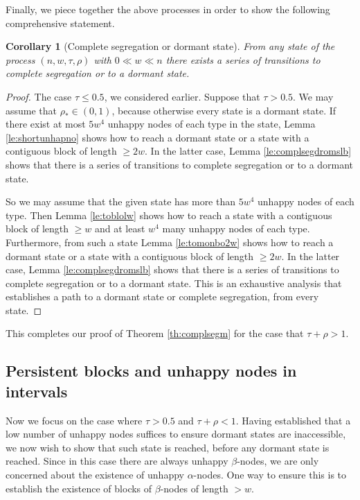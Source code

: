 \documentclass[11pt]{article}
\theoremstyle{plain}
\newtheorem{coro}[thm]{Corollary}
\numberwithin{equation}{subsection}
\begin{document}
Finally, we piece together the above processes in order to show the following
comprehensive statement.
\begin{coro}[Complete segregation or dormant state]\label{coro:inevcompsegd1}
From any state of the process $(n, w, \tau, \rho)$ with $0\ll w\ll n$
there exists a series of transitions to complete segregation or to a dormant state.
\end{coro}
\begin{proof}
The case  $\tau\leq 0.5$, we considered earlier. 
Suppose that $\tau>0.5$. 
We may assume that
$\rho_{\ast}\in (0,1)$, because otherwise
every state is a dormant state. 
If there exist at most $5w^4$ unhappy nodes of each type in the state, 
Lemma \ref{le:shortunhapno} shows how to reach a dormant state or a state
with a contiguous block
of length $\geq 2w$. In the latter case, 
Lemma \ref{le:complsegdromslb} shows that there is a series of transitions
to complete segregation or to a dormant state.

So we may assume that  the given state has more than 
$5w^4$ unhappy nodes of each type.
Then Lemma \ref{le:toblolw} shows how to reach a state with a contiguous block
of length $\geq w$ and at least $w^4$ many unhappy nodes of each type.
Furthermore, from such a state Lemma \ref{le:tomonbo2w} shows how to reach a 
dormant state or a state
with a contiguous block
of length $\geq 2w$. In the latter case,  
Lemma \ref{le:complsegdromslb} shows that there is a series of transitions
to complete segregation or to a dormant state.
This is an exhaustive analysis that establishes a path to a dormant state or complete segregation, from
every state.
\end{proof}

This completes our proof of Theorem \ref{th:complsegm} for the  case that $\tau +\rho>1$.

\subsection{Persistent blocks and unhappy nodes in intervals}
Now we focus on the case where $\tau>0.5$ and $\tau +\rho<1$.
Having established that a low number of unhappy nodes suffices to ensure dormant states are inaccessible, we now wish 
to show that such state is reached, before any dormant state is reached. Since in this case there are always
unhappy $\beta$-nodes, we are only concerned about the existence of unhappy $\alpha$-nodes.
One way to ensure this is to establish the existence of blocks of $\beta$-nodes of length $>w$.
\end{document}

